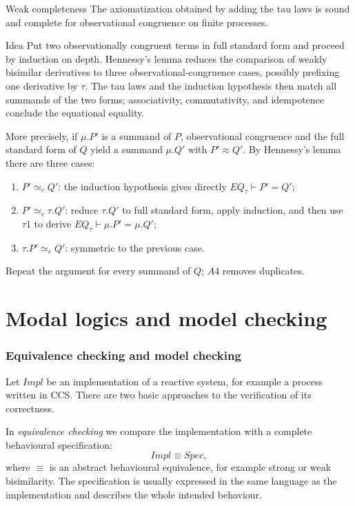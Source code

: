 \documentclass[a4paper]{article}
\begin{document}
\begin{snippettheorem}{Weak completeness}
    The axiomatization obtained by adding the tau laws is sound and complete for observational congruence on finite processes.
\end{snippettheorem}

\begin{snippetproof}{Idea}
    Put two observationally congruent terms in full standard form and proceed by induction on depth.
    Hennessy's lemma reduces the comparison of weakly bisimilar derivatives to three observational-congruence cases, possibly prefixing one derivative by \(\tau\).
    The tau laws and the induction hypothesis then match all summands of the two forms; associativity, commutativity, and idempotence conclude the equational equality.
\end{snippetproof}

More precisely, if \(\mu.P'\) is a summand of \(P\), observational congruence and the full standard form of \(Q\) yield a summand \(\mu.Q'\) with \(P'\approx Q'\).
By Hennessy's lemma there are three cases:
\begin{enumerate}
    \item \(P'\simeq_c Q'\): the induction hypothesis gives directly \(EQ_\tau\vdash P'=Q'\);
    \item \(P'\simeq_c\tau.Q'\): reduce \(\tau.Q'\) to full standard form, apply induction, and then use \(\tau1\) to derive \(EQ_\tau\vdash\mu.P'=\mu.Q'\);
    \item \(\tau.P'\simeq_c Q'\): symmetric to the previous case.
\end{enumerate}
Repeat the argument for every summand of \(Q\); \(A4\) removes duplicates.

\pagebreak
\part{Modal logics and model checking}

\section{Equivalence checking and model checking}

Let \(\mathit{Impl}\) be an implementation of a reactive system, for example a process written in CCS.
There are two basic approaches to the verification of its correctness.

In \emph{equivalence checking} we compare the implementation with a complete behavioural specification:
\[
    \mathit{Impl} \equiv \mathit{Spec},
\]
where \(\equiv\) is an abstract behavioural equivalence, for example strong or weak bisimilarity.
The specification is usually expressed in the same language as the implementation and describes the whole intended behaviour.
\end{document}
